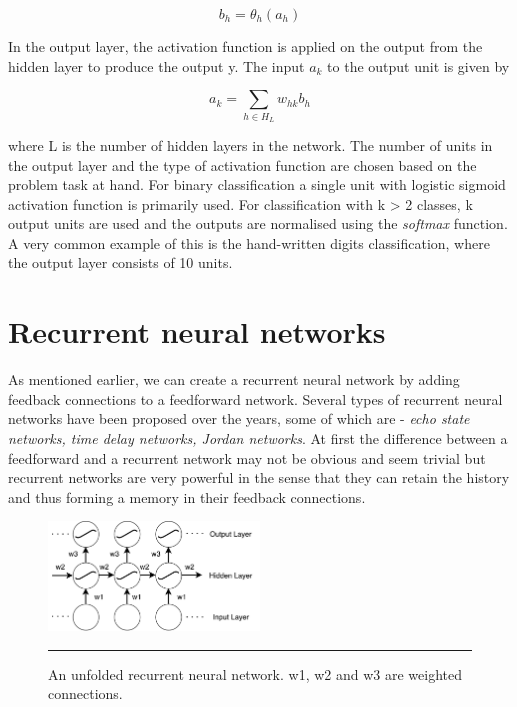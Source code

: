     \begin{equation}
        b_{h} = \theta_{h}(a_{h})
    \end{equation}

In the output layer, the activation function is applied on the output from the hidden layer to
produce the output y. The input $a_{k}$ to the output unit is given by

    \begin{equation}
        a_{k} = \displaystyle\sum_{h \in H_{L}} w_{hk}b_{h}
    \end{equation}

where L is the number of hidden layers in the network. The number of units in the output layer
and the type of activation function are chosen based on the problem task at hand. For binary
classification a single unit with logistic sigmoid activation function is primarily used. For
classification with k > 2 classes, k output units are used and the outputs are normalised using
the \emph{softmax} function. A very common example of this is the hand-written digits classification,
where the output layer consists of 10 units.

\section{Recurrent neural networks}
As mentioned earlier, we can create a recurrent neural network by adding feedback connections to
a feedforward network. Several types of recurrent neural networks have been proposed over the
years, some of which are - \emph{echo state networks, time delay networks, Jordan networks}. At
first the difference between a feedforward and a recurrent network may not be obvious and seem
trivial but recurrent networks are very powerful in the sense that they can retain the history and
thus forming a memory in their feedback connections.

\begin{figure}[htbp]
  \centering
    \includegraphics[width=0.5\textwidth,height=0.5\textheight,keepaspectratio]
    {Figures/unfolded-rnn.pdf}
    \rule{35em}{0.5pt}
  \caption[An unfolded RNN] {An unfolded recurrent neural network. w1, w2 and w3 are weighted
  connections. }
  \label{fig:unfoldedRNN}
\end{figure}

